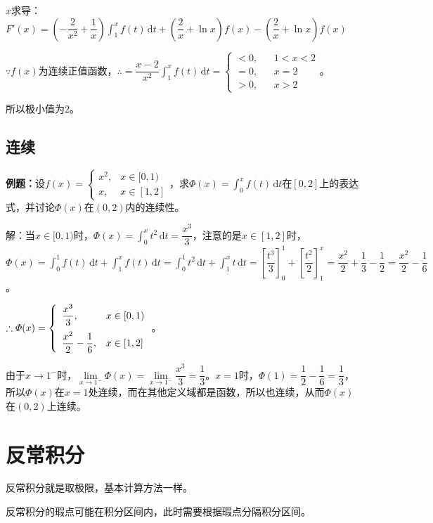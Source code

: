 \documentclass[UTF8, 12pt]{ctexart}
\begin{document}
$x$求导：$F'(x)=\left(-\dfrac{2}{x^2}+\dfrac{1}{x}\right)\int_1^xf(t)\,\textrm{d}t+\left(\dfrac{2}{x}+\ln x\right)f(x)-\left(\dfrac{2}{x}+\ln x\right)f(x)$

$\because f(x)$为连续正值函数，$\therefore=\dfrac{x-2}{x^2}\int_1^xf(t)\,\textrm{d}t=\left\{\begin{array}{lcl}
    < 0, & & 1<x<2 \\
    =0, & & x=2 \\
    >0, & & x>2
\end{array}\right.$。

所以极小值为$2$。

\subsection{连续}

\textbf{例题：}设$f(x)=\left\{\begin{array}{ll}
    x^2, & x\in[0,1) \\
    x, & x\in[1,2]
\end{array}\right.$，求$\varPhi(x)=\int_0^xf(t)\,\textrm{d}t$在$[0,2]$上的表达式，并讨论$\varPhi(x)$在$(0,2)$内的连续性。

解：当$x\in[0,1)$时，$\varPhi(x)=\int_0^xt^2\,\textrm{d}t=\dfrac{x^3}{3}$，注意的是$x\in[1,2]$时，$\varPhi(x)=\int_0^1f(t)\,\textrm{d}t+\int_1^xf(t)\,\textrm{d}t=\int_0^1t^2\,\textrm{d}t+\int_1^xt\,\textrm{d}t=\left[\dfrac{t^3}{3}\right]_0^1+\left[\dfrac{t^2}{2}\right]_1^x=\dfrac{x^2}{2}+\dfrac{1}{3}-\dfrac{1}{2}=\dfrac{x^2}{2}-\dfrac{1}{6}$。

$\therefore\varPhi(x)=\left\{\begin{array}{ll}
    \dfrac{x^3}{3}, & x\in[0,1) \medskip \\
    \dfrac{x^2}{2}-\dfrac{1}{6}, & x\in[1,2]
\end{array}\right.$。

由于$x\to1^-$时，$\lim\limits_{x\to1^-}\varPhi(x)=\lim\limits_{x\to1^-}\dfrac{x^3}{3}=\dfrac{1}{3}$。$x=1$时，$\varPhi(1)=\dfrac{1}{2}-\dfrac{1}{6}=\dfrac{1}{3}$，所以$\varPhi(x)$在$x=1$处连续，而在其他定义域都是函数，所以也连续，从而$\varPhi(x)$在$(0,2)$上连续。

\section{反常积分}

反常积分就是取极限，基本计算方法一样。

反常积分的瑕点可能在积分区间内，此时需要根据瑕点分隔积分区间。
\end{document}
